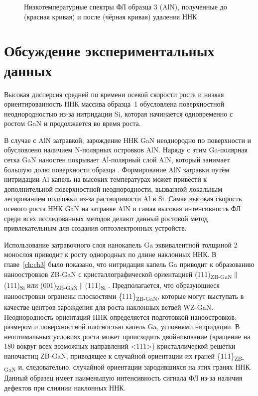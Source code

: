 \begin{figure}[ht]   \caption{Низкотемпературные спектры ФЛ образца 3
		(AlN), полученные до (красная кривая) и после (чёрная кривая) удаления
ННК}\label{fig:Image_30_2} \end{figure}

\section{Обсуждение экспериментальных данных}\label{sec:ch4/sec5}

Высокая дисперсия средней по времени осевой скорости роста и низкая
ориентированность ННК массива образца~1 обусловлена поверхностной
неоднородностью из-за нитридации Si, которая начинается одновременно с ростом
GaN и продолжается во время роста.

В случае с AlN затравкой, зарождение ННК GaN неоднородно по поверхности и
обусловлено наличием N-полярных островков AlN. Наряду с этим Ga-полярная сетка
GaN наностен покрывает Al-полярный слой AlN, который занимает большую долю
поверхности образца \cite{Auzelle2015}. Формирование AlN затравки путём
нитридации Al капель на высоких температурах может привести к дополнительной
поверхностной неоднородности, вызванной локальным легированием подложки из-за
растворимости Al в Si. Самая высокая скорость осевого роста ННК GaN на затравке
AlN и самая высокая интенсивность ФЛ среди всех исследованных методов делают
данный ростовой метод привлекательным для создания оптоэлектронных устройств.

Использование затравочного слоя нанокапель Ga эквивалентной толщиной 2 монослоя
приводит к росту однородных по длине наклонных ННК. В главе~\cref{ch:ch3} было
показано, что нитридация капель Ga приводит к образованию наноостровков ZB-GaN
с кристаллографической ориентацией
(111)\textsubscript{ZB-GaN}\(\parallel\)(111)\textsubscript{Si} или
(001)\textsubscript{ZB-GaN}\(\parallel\)(111)\textsubscript{Si}
\cite{Fedorov2018}. Предполагается, что образующиеся наноостровки огранены
плоскостями \{111\}\textsubscript{ZB-GaN}, которые могут выступать в качестве
центров зарождения для роста наклонных ветвей WZ-GaN. Неоднородность ориентаций
ННК определяется подготовкой наноостровков: размером и поверхностной плотностью
капель Ga, условиями нитридации. В неоптимальных условиях роста может
происходить двойникование (вращение на 180{\textdegree} вокруг всех возможных
направлений <111>) кристаллической решётки наночастиц ZB-GaN, приводящее к
случайной ориентации их граней \{111\}\textsubscript{ZB-GaN} и, следовательно,
случайной ориентации зародившихся на этих гранях ННК. Данный образец имеет
наименьшую интенсивность сигнала ФЛ из-за наличия дефектов при слиянии
наклонных ННК.

